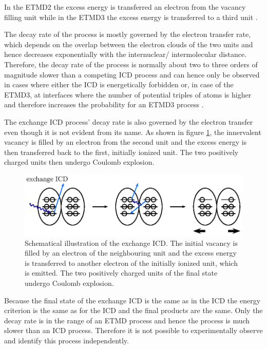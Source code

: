 In the ETMD2 \cite{Zobeley01} the excess energy is transferred an electron
from the vacancy filling unit while in the ETMD3 the excess energy is transferred
to a third unit \cite{Zobeley98}.

The decay rate of the process is mostly governed by the electron transfer rate, which
depends on the overlap between the electron clouds of the two units and hence
decreases exponentially with the internuclear/ intermolecular distance. Therefore,
the decay rate of the process is normally about two to three orders of magnitude slower
than a competing ICD process and can hence only be observed in cases where either
the ICD is energetically forbidden or, in case of the ETMD3, at interfaces
where the number of potential
triples of atoms is higher and therefore increases the probability for an ETMD3 process
\cite{Fasshauer13}.

The exchange ICD process' decay rate is also governed by the electron transfer
even though it is not evident from its name. As shown in
figure \ref{figure:exICD_process}, the innervalent vacancy is filled by an electron
from the second unit and the excess energy is then transferred back to the first,
initially ionized unit. The two positively charged units then undergo Coulomb
explosion.

\begin{figure}[h]
 \centering
 \includegraphics{pics/exicd-pspic.eps}
 \caption{Schematical illustration of the exchange \ac{ICD}. The initial
          vacancy is filled by an electron of the neighbouring unit and the
          excess energy is transferred to another electron of the initially ionized
          unit, which is emitted. The two positively charged units of the final
          state undergo Coulomb explosion.}
 \label{figure:exICD_process}
\end{figure}

Because the final state of the exchange ICD is the same as in the ICD the energy
criterion is the same as for the ICD and the final products are the same. Only
the decay rate is in the range of an ETMD process and hence the process is much
slower than an ICD process. Therefore it is not possible to experimentally
observe and identify this process independently. \cite{Zobeley01}


